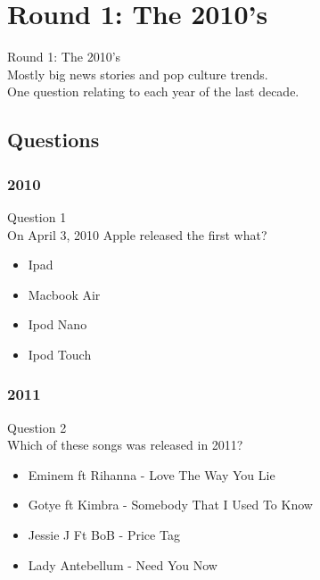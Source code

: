 \documentclass{beamer}
\begin{document}
\begin{frame}
\titlepage %
\end{frame}








\section{Round 1: The 2010's}

\begin{frame}
\centering
\Huge
Round 1: The 2010's\\
\large
Mostly big news stories and pop culture trends.\\
\small
One question relating to each year of the last decade.
\end{frame}

\subsection{Questions}

\begin{frame}
\frametitle{2010}
Question 1\\
On April 3, 2010 Apple released the first what?
\begin{itemize}
\item Ipad 
\item Macbook Air
\item Ipod Nano
\item Ipod Touch
\end{itemize}


\end{frame}

\begin{frame}
\frametitle{2011}
Question 2\\
Which of these songs was released in 2011?
\begin{itemize}

\item Eminem ft Rihanna - Love The Way You Lie
\item Gotye ft Kimbra - Somebody That I Used To Know
\item Jessie J Ft BoB - Price Tag
\item  Lady Antebellum - Need You Now
\end{itemize}


\end{frame}
\end{document}

